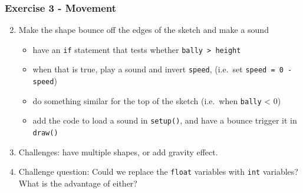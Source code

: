 \documentclass[ignorenonframetext,]{beamer}
\begin{document}
\begin{frame}[fragile]\frametitle{Exercise 3 - Movement}

\begin{enumerate}[1.]
\setcounter{enumi}{1}
\item
  Make the shape bounce off the edges of the sketch and make a sound

  \begin{itemize}
  \item
    have an \texttt{if} statement that tests whether
    \texttt{bally \textgreater{} height}
  \item
    when that is true, play a sound and invert \texttt{speed}, (i.e.~set
    \texttt{speed = 0 - speed})
  \item
    do something similar for the top of the sketch (i.e.~when
    \texttt{bally} \textless{} 0)
  \item
    add the code to load a sound in \texttt{setup()}, and have a bounce
    trigger it in \texttt{draw()}
  \end{itemize}
\item
  Challenges: have multiple shapes, or add gravity effect.
\item
  Challenge question: Could we replace the \texttt{float} variables with
  \texttt{int} variables? What is the advantage of either?
\end{enumerate}

\end{frame}
\end{document}
